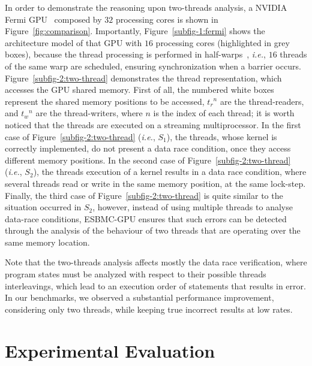 \documentclass[times, doublespace]{cpeauth}
\begin{document}
In order to demonstrate the reasoning upon two-threads analysis, a NVIDIA Fermi GPU~\cite{cudaproguide:2015} composed by $32$ processing cores is shown in Figure~\ref{fig:comparison}. Importantly, Figure~\ref{subfig-1:fermi} shows the architecture model of that GPU with $16$ processing cores (highlighted in grey boxes), because the thread processing is performed in half-warps~\cite{fermi:2009}, {\it i.e.}, $16$ threads of the same warp are scheduled, ensuring synchronization when a barrier occurs. Figure~\ref{subfig-2:two-thread} demonstrates the thread representation, which accesses the GPU shared memory. First of all, the numbered white boxes represent the shared memory positions to be accessed, ${t_{r}}^n$ are the thread-readers, and ${t_{w}}^n$ are the thread-writers, where $n$ is the index of each thread; it is worth noticed that the threads are executed on a streaming multiprocessor. In the first case of Figure~\ref{subfig-2:two-thread} (\textit{i.e.}, $S_{1}$), the threads, whose kernel is correctly implemented, do not present a data race condition, once they access different memory positions. In the second case of Figure~\ref{subfig-2:two-thread} (\textit{i.e.}, $S_{2}$), the threads execution of a kernel results in a data race condition, where several threads read or write in the same memory position, at the same lock-step. Finally, the third case of Figure~\ref{subfig-2:two-thread} is quite similar to the situation occurred in $S_{2}$, however, instead of using multiple threads to analyse data-race conditions, ESBMC-GPU ensures that such errors can be detected through the analysis of the behaviour of two threads that are operating over the same memory location.

Note that the two-threads analysis affects mostly the data race verification, where program states must be analyzed with respect to their possible threads interleavings, which lead to an execution order of statements that results in error. In our benchmarks, we observed a substantial performance improvement, considering only two threads, while keeping true incorrect results at low rates.

\vspace{-6pt}
\section{Experimental Evaluation}
\vspace{-2pt}
\label{sec:resultadosExperimentais}
\end{document}
